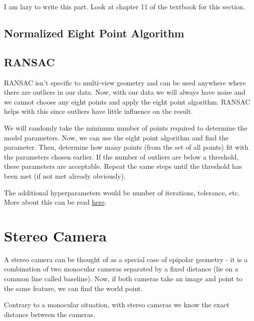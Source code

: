 I am lazy to write this part. Look at chapter 11 of the textbook for this section. 

\subsection{Normalized Eight Point Algorithm}



\subsection{RANSAC}

RANSAC isn't specific to multi-view geometry and can be used anywhere where there are outliers in our data. Now, with our data we will always have noise and we cannot choose any eight points and apply the eight point algorithm. RANSAC helps with this since outliers have little influence on the result. 

We will randomly take the minimum number of points required to determine the model parameters. Now, we can use the eight point algorithm and find the parameter. Then, determine how many points (from the set of all points) fit with the parameters chosen earlier. If the number of outliers are below a threshold, these parameters are acceptable. Repeat the same steps until the threshold has been met (if not met already obviously). 

The additional hyperparameters would be number of iterations, tolerance, etc. More about this can be read \href{http://www.cse.yorku.ca/~kosta/CompVis_Notes/ransac.pdf}{here}.

\section{Stereo Camera}

A stereo camera can be thought of as a special case of epipolar geometry - it is a combination of two monocular cameras separated by a fixed distance (lie on a common line called baseline). Now, if both cameras take an image and point to the same feature, we can find the world point.

Contrary to a monocular situation, with stereo cameras we know the exact distance between the cameras. 
